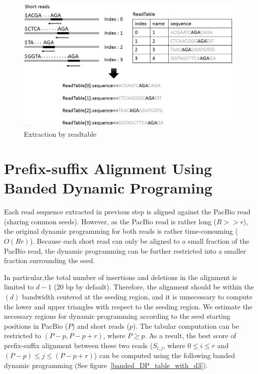 \begin{figure} [h]
\centering
\includegraphics[scale=0.5]{Figures/chapter3/extraction_readtable.png}
\caption{Extraction by readtable}
\label{extraction_readtable}
\end{figure}

\newpage

\section{Prefix-suffix Alignment Using Banded Dynamic Programing}

Each read sequence extracted in previous step is aligned against the PacBio read (sharing common seeds). However, as the PacBio read is rather long ($R>>r$), the original dynamic programming for both reads is rather time-consuming ($O(Rr)$). Because each short read can only be aligned to a small fraction of the PacBio read, the dynamic programming can be further restricted into a smaller fraction surrounding the seed. 


In particular,the total number of insertions and deletions in the alignment is limited to $d-1$ (20 bp by default). Therefore, the alignment should be within the $(d)$ bandwidth centered at the seeding region, and it is unnecessary to compute the lower and upper triangles with respect to the seeding region. We estimate the necessary regions for dynamic programming according to the seed starting positions in PacBio ($P$) and short reads ($p$). The tabular computation can be restricted to $(P-p, P-p+r)$, where $P \geq p$. As a result, the best score of prefix-suffix alignment between these two reads ($S_{i,j}$, where $0 \leq i \leq r$ and $(P-p) \leq j \leq (P-p+r) $) can be computed using the following banded dynamic programming (See figure~\ref{banded_DP_table_with_d3}).

